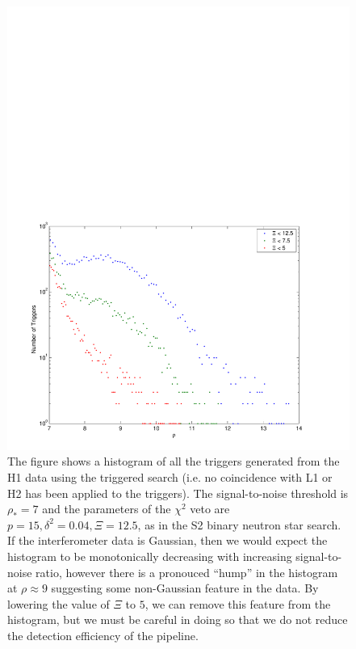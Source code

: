 \begin{figure}[p]
\begin{center}
\includegraphics[width=\textwidth]{figures/result/h1l1_snr_hist_delta_0_04_chisq_12_5}
\end{center}
\caption[Tuning the $\chi^2$ Veto for H1]{%
\label{f:h1_chisq_tuning}
The figure shows a histogram of all the triggers generated from the H1 data
using the triggered search (i.e. no coincidence with L1 or H2 has been applied
to the triggers). The signal-to-noise threshold is $\rho_\ast = 7$ and the
parameters of the $\chi^2$ veto are $p = 15, \delta^2 = 0.04, \Xi = 12.5$, as
in the S2 binary neutron star search. If the interferometer data is Gaussian,
then we would expect the histogram to be monotonically decreasing with
increasing signal-to-noise ratio, however there is a pronouced ``hump'' in the
histogram at $\rho\approx 9$ suggesting some non-Gaussian feature in the data.
By lowering the value of $\Xi$ to $5$, we can remove this feature from the
histogram, but we must be careful in doing so that we do not reduce the
detection efficiency of the pipeline.
}
\end{figure}


